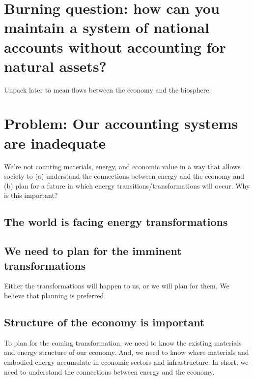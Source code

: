 \section{Burning question: how can you maintain a system of national accounts without accounting for natural assets?}
\label{sec:burning_question}

Unpack later to mean flows between the economy and the biosphere.

\section{Problem: Our accounting systems are inadequate}
\label{sec:problem}

We're not counting materials, energy, and economic value in a way that allows society to (a) understand the connections between energy and the economy and (b) plan for a future in which energy transitions/transformations will occur. Why is this important?

\subsection{The world is facing energy transformations}
\label{sec:transormations}



\subsection{We need to plan for the imminent transformations}
\label{sec:planning}

Either the transformations will happen to us, or we will plan for them. We believe that planning is preferred.

\subsection{Structure of the economy is important}
\label{sec:structure}

To plan for the coming transformation, we need to know the existing materials and energy structure of our economy. And, we need to know where materials and embodied energy accumulate in economic sectors and infrastructure. In short, we need to understand the connections between energy and the economy.

